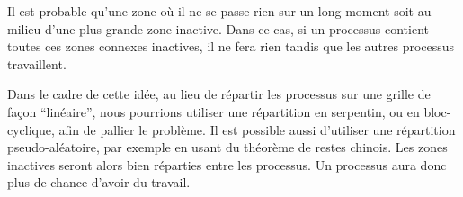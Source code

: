 Il est probable qu'une zone où il ne se passe rien sur un long moment soit au milieu d'une plus grande zone inactive. Dans ce cas, si un processus contient toutes ces zones connexes inactives, il ne fera rien tandis que les autres processus travaillent.

Dans le cadre de cette idée, au lieu de répartir les processus sur une grille de façon ``linéaire'', nous pourrions utiliser une répartition en serpentin, ou en bloc-cyclique, afin de pallier le problème. Il est possible aussi d'utiliser une répartition pseudo-aléatoire, par exemple en usant du théorème de restes chinois. Les zones inactives seront alors bien réparties entre les processus. Un processus aura donc plus de chance d'avoir du travail. 


